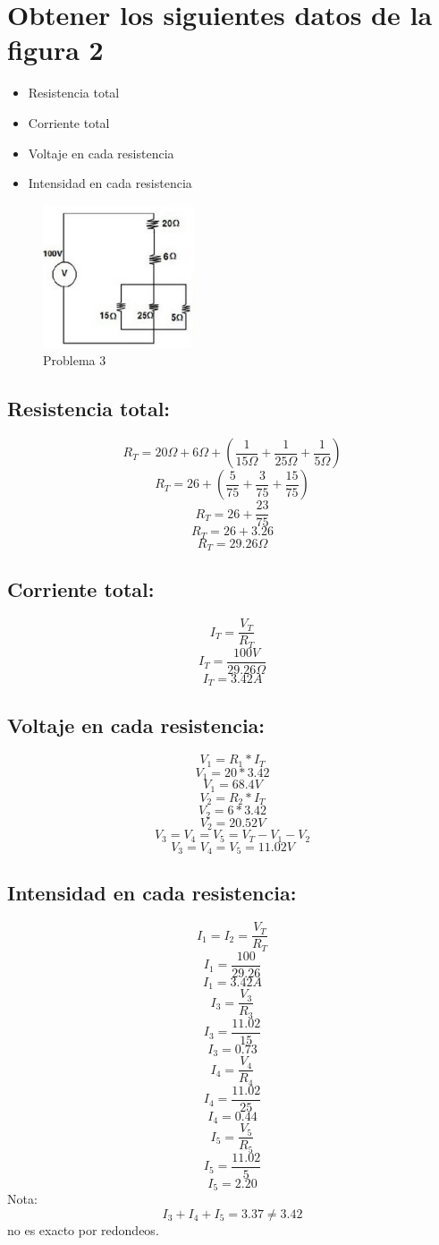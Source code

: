 \documentclass[stu, 12pt, letterpaper, donotrepeattitle, floatsintext, natbib, helv]{apa7}
\begin{document}
\section{Obtener los siguientes datos de la figura 2}
\begin{itemize}
    \item Resistencia total
    \item Corriente total
    \item Voltaje en cada resistencia
    \item Intensidad en cada resistencia
\end{itemize}
\begin{figure} [H]
    \centering
    \includegraphics[width=0.4\textwidth] {Problem3.png}
    \caption{Problema 3}
    \label{fig:figureP3}
\end{figure}
\subsection{Resistencia total:}
\[R_T = 20\Omega + 6\Omega + (\frac{1}{15\Omega} + \frac{1}{25\Omega} + \frac{1}{5\Omega})\]
\[R_T = 26 + (\frac{5}{75} + \frac{3}{75} + \frac{15}{75})\]
\[R_T = 26 + \frac{23}{75}\]
\[R_T = 26 + 3.26\]
\[R_T = 29.26\Omega\]
\subsection{Corriente total:}
\[I_T = \frac{V_T}{R_T}\]
\[I_T = \frac{100V}{29.26\Omega}\]
\[I_T = 3.42A\]
\subsection{Voltaje en cada resistencia:}
\[V_1 = R_1 * I_T\]
\[V_1 = 20 * 3.42\]
\[V_1 = 68.4V\]
\[V_2 = R_2 * I_T\]
\[V_2 = 6 * 3.42\]
\[V_2 = 20.52V\]
\[V_3 = V_4 = V_5 = V_T - V_1 - V_2\]
\[V_3 = V_4 = V_5 = 11.02V\]


\subsection{Intensidad en cada resistencia:}
\[I_1 = I_2 = \frac{V_T}{R_T}\]
\[I_1 = \frac{100}{29.26}\]
\[I_1 = 3.42A\]
\[I_3 = \frac{V_3}{R_3}\]
\[I_3 = \frac{11.02}{15}\]
\[I_3 = 0.73\]
\[I_4 = \frac{V_4}{R_4}\]
\[I_4 = \frac{11.02}{25}\]
\[I_4 = 0.44\]
\[I_5 = \frac{V_5}{R_5}\]
\[I_5 = \frac{11.02}{5}\]
\[I_5 = 2.20\]
Nota: \[I_3 + I_4 + I_5 = 3.37 \neq 3.42\] no es exacto por redondeos.
\end{document}
